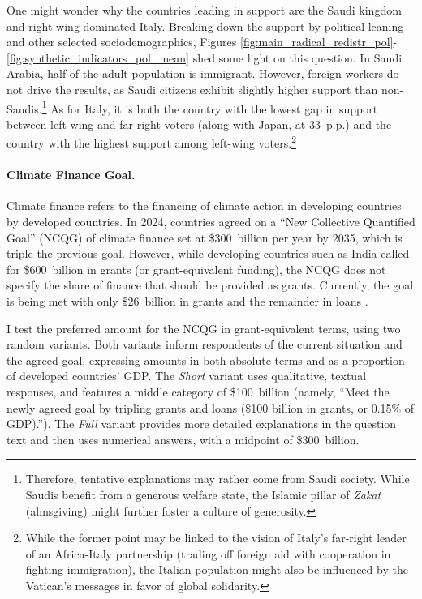 \documentclass[12pt,english]{article}
\begin{document}
\begin{bibunit}
One might wonder why the countries leading in support are the Saudi kingdom and right-wing-dominated Italy. Breaking down the support by political leaning and other selected sociodemographics, Figures \ref{fig:main_radical_redistr_pol}-\ref{fig:synthetic_indicators_pol_mean} shed some light on this question. In Saudi Arabia, half of the adult population is immigrant. %
However, foreign workers do not drive the results, as Saudi citizens exhibit slightly higher support than non-Saudis.\footnote{Therefore, tentative explanations may rather come from Saudi society. While Saudis benefit from a generous welfare state, the Islamic pillar of \textit{Zakat} (almsgiving) might further foster a culture of generosity.} 
As for Italy, it is both the country with the lowest gap in support between left-wing and far-right voters (along with Japan, at 33~p.p.) and the country with the highest support among left-wing voters.\footnote{While the former point may be linked to the vision of Italy's far-right leader of an Africa-Italy partnership (trading off foreign aid with cooperation in fighting immigration), the Italian population might also be influenced by the Vatican's messages in favor of global solidarity.} 

\paragraph{Climate Finance Goal.}\label{par:ncqg}

Climate finance refers to the financing of climate action in developing countries by developed countries. In 2024, countries agreed on a ``New Collective Quantified Goal'' (NCQG) of climate finance set at \$300~billion per year by 2035, which is triple the previous goal. However, while developing countries such as India called for \$600~billion in grants (or grant-equivalent funding), the NCQG does not specify the share of finance that should be provided as grants. Currently, the goal is being met with only \$26~billion in grants and the remainder in loans \citep{oecd_climate_2024}. 

I test the preferred amount for the NCQG in grant-equivalent terms, using two random variants. Both variants inform respondents of the current situation and the agreed goal, expressing amounts in both absolute terms and as a proportion of developed countries' GDP. The \textit{Short} variant uses qualitative, textual responses, and features a middle category of \$100~billion (namely, ``Meet the newly agreed goal by tripling grants and loans (\$100 billion in grants, or 0.15\% of GDP).''). The \textit{Full} variant provides more detailed explanations in the question text and then uses numerical answers, with a midpoint of \$300~billion. 


\end{bibunit}
\end{document}
